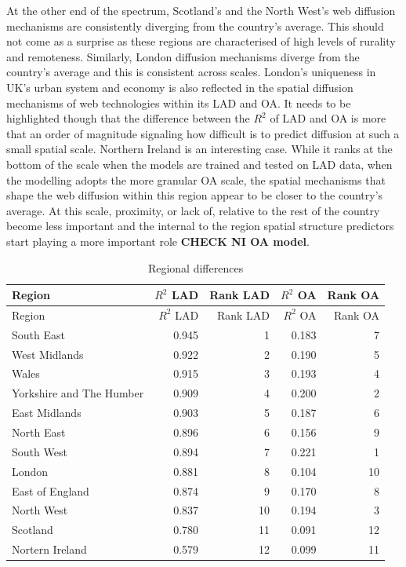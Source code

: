 \documentclass[
  authoryear,
  preprint,
  3p]{elsarticle}
\begin{document}
At the other end of the spectrum, Scotland's and the North West's web
diffusion mechanisms are consistently diverging from the country's
average. This should not come as a surprise as these regions are
characterised of high levels of rurality and remoteness. Similarly,
London diffusion mechanisms diverge from the country's average and this
is consistent across scales. London's uniqueness in UK's urban system
and economy is also reflected in the spatial diffusion mechanisms of web
technologies within its LAD and OA. It needs to be highlighted though
that the difference between the \(R^2\) of LAD and OA is more that an
order of magnitude signaling how difficult is to predict diffusion at
such a small spatial scale. Northern Ireland is an interesting case.
While it ranks at the bottom of the scale when the models are trained
and tested on LAD data, when the modelling adopts the more granular OA
scale, the spatial mechanisms that shape the web diffusion within this
region appear to be closer to the country's average. At this scale,
proximity, or lack of, relative to the rest of the country become less
important and the internal to the region spatial structure predictors
start playing a more important role \textbf{CHECK NI OA model}.

\begin{longtable}[]{@{}lrrrr@{}}
\caption{Regional differences\label{table.regions}}\tabularnewline
\toprule\noalign{}
Region & \(R^2\) LAD & Rank LAD & \(R^2\) OA & Rank OA \\
\midrule\noalign{}
\endfirsthead
\toprule\noalign{}
Region & \(R^2\) LAD & Rank LAD & \(R^2\) OA & Rank OA \\
\midrule\noalign{}
\endhead
\bottomrule\noalign{}
\endlastfoot
South East & 0.945 & 1 & 0.183 & 7 \\
West Midlands & 0.922 & 2 & 0.190 & 5 \\
Wales & 0.915 & 3 & 0.193 & 4 \\
Yorkshire and The Humber & 0.909 & 4 & 0.200 & 2 \\
East Midlands & 0.903 & 5 & 0.187 & 6 \\
North East & 0.896 & 6 & 0.156 & 9 \\
South West & 0.894 & 7 & 0.221 & 1 \\
London & 0.881 & 8 & 0.104 & 10 \\
East of England & 0.874 & 9 & 0.170 & 8 \\
North West & 0.837 & 10 & 0.194 & 3 \\
Scotland & 0.780 & 11 & 0.091 & 12 \\
Nortern Ireland & 0.579 & 12 & 0.099 & 11 \\
\end{longtable}
\end{document}
